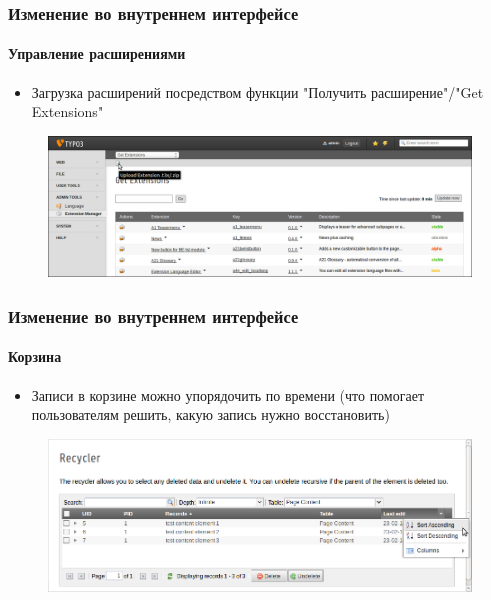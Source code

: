 
\begin{frame}[fragile]
	\frametitle{Изменение во внутреннем интерфейсе}
	\framesubtitle{Управление расширениями}

 	\begin{itemize}
		\item Загрузка расширений посредством функции "Получить расширение"/"Get Extensions"
	\end{itemize}

	\begin{figure}
		\includegraphics[width=0.95\linewidth]{Images/BackendChanges/UploadExtension.png}
	\end{figure}

\end{frame}


\begin{frame}[fragile]
	\frametitle{Изменение во внутреннем интерфейсе}
	\framesubtitle{Корзина}

 	\begin{itemize}
		\item Записи в корзине можно упорядочить по времени\newline
			\small(что помогает пользователям решить, какую запись нужно восстановить)\normalsize
	\end{itemize}

	\begin{figure}
		\includegraphics[width=0.95\linewidth]{Images/BackendChanges/RecyclerSortRecord.png}
	\end{figure}

\end{frame}

